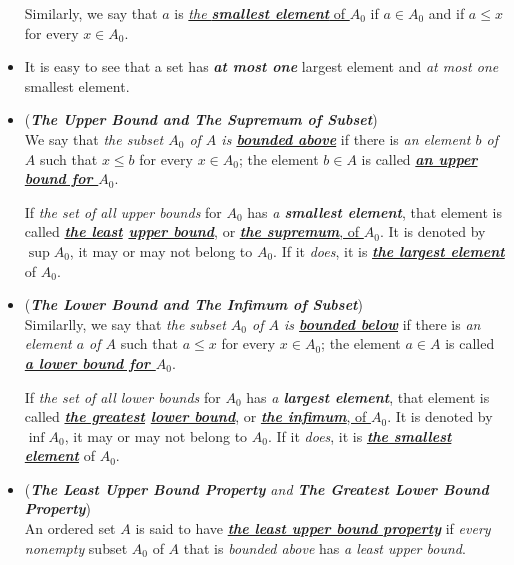 \documentclass[11pt]{article}
\begin{document}
\begin{itemize}
\begin{definition}
Similarly, we say that $a$ is \underline{\emph{the \textbf{smallest element}} of $A_0$} if $a \in A_0$ and if $a \le x$
for every $x \in A_0$. 
\end{definition}

\item \begin{remark}
It is easy to see that a set has \emph{\textbf{at most one}} largest element and \emph{at most one} smallest element.
\end{remark}

\item \begin{definition} (\emph{\textbf{The Upper Bound and The Supremum of Subset}})\\
We say that \emph{the subset $A_0$ of $A$ is \underline{\textbf{bounded above}}} if there is \emph{an element $b$ of $A$} such that $x \le b$ for every $x \in A_0$; the element $b \in A$ is called \underline{\emph{\textbf{an upper bound for $A_0$}}}. 

If \emph{the set of all upper bounds} for $A_0$ has \emph{a \textbf{smallest element}}, that element is called \emph{\textbf{\underline{the least} \underline{upper bound}}}, or \underline{\emph{\textbf{the supremum}}, of $A_0$}. It is denoted by $\sup A_0$, it may or may not belong to $A_0$. If it \emph{does}, it is \emph{\textbf{\underline{the largest element}}} of $A_0$.
\end{definition}

\item \begin{definition} (\emph{\textbf{The Lower Bound and The Infimum of Subset}})\\
Similarlly, we say that \emph{the subset $A_0$ of $A$ is \underline{\textbf{bounded below}}} if there is \emph{an element $a$ of $A$} such that $a \le x$ for every $x \in A_0$; the element $a \in A$ is called \underline{\emph{\textbf{a lower bound for $A_0$}}}. 

If \emph{the set of all lower bounds} for $A_0$ has \emph{a \textbf{largest element}}, that element is called \emph{\textbf{\underline{the greatest} \underline{lower bound}}}, or \underline{\emph{\textbf{the infimum}}, of $A_0$}. It is denoted by $\inf A_0$, it may or may not belong to $A_0$. If it \emph{does}, it is \emph{\textbf{\underline{the smallest element}}} of $A_0$.
\end{definition}

\item \begin{definition} (\textit{\textbf{The Least Upper Bound Property} and \textbf{The Greatest Lower Bound Property}})\\
An ordered set $A$ is said to have \underline{\emph{\textbf{the least upper bound property}}} if \emph{every} \emph{nonempty} subset $A_0$ of $A$ that is \emph{bounded above} has \emph{a least upper bound}. 


\end{definition}
\end{itemize}
\end{document}
